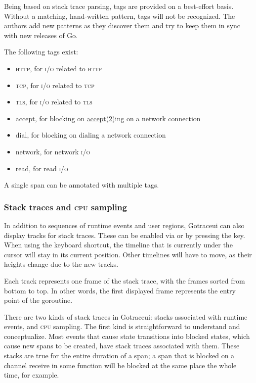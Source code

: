 \documentclass[10pt,letterpaper,oneside,openany,english]{memoir}
\newcommand{\code}[1]{{\ttfamily\mbox{#1}}}
\begin{document}
Being based on stack trace parsing, tags are provided on a best-effort basis.
Without a matching, hand-written pattern, tags will not be recognized.
The authors add new patterns as they discover them and try to keep them in sync with new releases of Go.

The following tags exist:

\begin{itemize}
\item \code{\textsc{http}}, for \textsc{i/o} related to \textsc{http}
\item \code{\textsc{tcp}}, for \textsc{i/o} related to \textsc{tcp}
\item \code{\textsc{tls}}, for \textsc{i/o} related to \textsc{tls}
\item \code{accept}, for blocking on \href{https://man7.org/linux/man-pages/man2/accept.2.html}{accept(2)}ing\cite{AcceptLinuxManual2021} on a network connection
\item \code{dial}, for blocking on dialing a network connection
\item \code{network}, for network \textsc{i/o}
\item \code{read}, for read \textsc{i/o}
\end{itemize}

A single span can be annotated with multiple tags.


\subsubsection{Stack traces and \textsc{cpu} sampling}\label{cpu-sampling}
In addition to sequences of runtime events and user regions, Gotraceui can also display tracks for stack traces.
These can be enabled via  or by pressing the  key.
When using the keyboard shortcut, the timeline that is currently under the cursor will stay in its current position.
Other timelines will have to move, as their heights change due to the new tracks.

Each track represents one frame of the stack trace, with the frames sorted from bottom to top.
In other words, the first displayed frame represents the entry point of the goroutine.

There are two kinds of stack traces in Gotraceui: stacks associated with runtime events, and \textsc{cpu} sampling.
The first kind is straightforward to understand and conceptualize.
Most events that cause state transitions into blocked states, which cause new spans to be created, have stack traces associated with them.
These stacks are true for the entire duration of a span;
a span that is blocked on a channel receive in some function will be blocked at the same place the whole time, for example.
\end{document}
